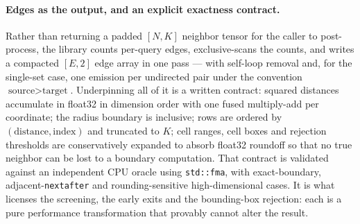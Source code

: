 \documentclass[11pt]{article}
\begin{document}
\paragraph{Edges as the output, and an explicit exactness contract.}
Rather than returning a padded $[N,K]$ neighbor tensor for the caller to
post-process, the library counts per-query edges, exclusive-scans the counts, and
writes a compacted $[E,2]$ edge array in one pass --- with self-loop removal and,
for the single-set case, one emission per undirected pair under the convention
$\text{source} > \text{target}$. Underpinning all of it is a written contract:
squared distances accumulate in float32 in dimension order with one fused
multiply-add per coordinate; the radius boundary is inclusive; rows are ordered
by $(\text{distance}, \text{index})$ and truncated to $K$; cell ranges, cell
boxes and rejection thresholds are conservatively expanded to absorb float32
roundoff so that no true neighbor can be lost to a boundary computation. That
contract is validated against an independent CPU oracle using \texttt{std::fma},
with exact-boundary, adjacent-\texttt{nextafter} and rounding-sensitive
high-dimensional cases. It is what licenses the screening, the early exits and
the bounding-box rejection: each is a pure performance transformation that
provably cannot alter the result.
\end{document}
